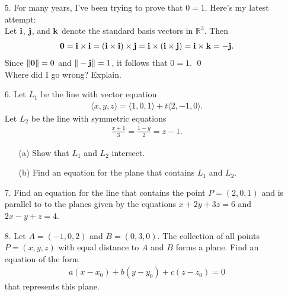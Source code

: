 \documentclass[reqno, 12pt]{amsart}
\newcommand{\R}{\mathbb R}
\begin{document}
\begin{itemize}
{{              }%
          }
          \vspace{0.5 in}
          \newpage
    \item[5.] For many years, I've been trying to prove that $0 = 1$. Here's my latest attempt:\\

          Let ${\bf i}$, ${\bf j}$, and ${\bf k}$ denote the standard basis vectors in $\R^3$. Then
          \begin{align*}
              {\bf 0} = {\bf i} \times {\bf i} = ({\bf i} \times {\bf i}) \times {\bf j} = {\bf i} \times ({\bf i} \times {\bf j}) = {\bf i} \times {\bf k} = -{\bf j}.
          \end{align*}
          Since $\|{\bf 0}\| = 0$ and $\|-{\bf j}\| = 1$, it follows that $0 = 1$. \qed\\

          Where did I go wrong? Explain.

          \vspace{2.5 in}
    \item[6.] Let $L_1$ be the line with vector equation
          \begin{align*}
              \langle x,y,z\rangle = \langle 1,0,1\rangle + t\langle 2,-1,0\rangle.
          \end{align*}
          Let $L_2$ be the line with symmetric equations
          \begin{align*}
              \frac{x+1}{3} = \frac{1-y}{2} = z-1.
          \end{align*}
          \begin{enumerate}
              \item[(a)]{Show that $L_1$ and $L_2$ intersect.}

                    \newpage
              \item[(b)]{Find an equation for the plane that contains $L_1$ and $L_2$.}
          \end{enumerate}

          \vspace{4 in}
    \item[7.] Find an equation for the line that contains the point $P = (2,0,1)$ and is parallel to to the planes given by the equations $x+2y+3z = 6$ and $2x-y+z = 4$.

          \newpage
    \item[8.] Let $A = (-1,0,2)$ and $B = (0,3,0)$. The collection of all points $P = (x,y,z)$ with equal distance to $A$ and $B$ forms a plane. Find an equation of the form
          \begin{align*}
              a(x-x_0)+b(y-y_0) + c(z-z_0) = 0
          \end{align*}
          that represents this plane.

\end{itemize}
\end{document}
